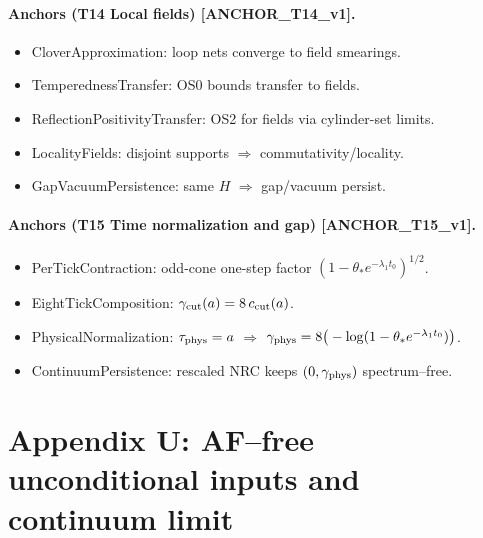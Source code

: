 \documentclass[11pt]{amsart}
\theoremstyle{plain}
\theoremstyle{definition}
\theoremstyle{remark}
\begin{document}
\paragraph{Anchors (T14 Local fields) [ANCHOR\_T14\_v1].}
\begin{itemize}
  \item CloverApproximation: loop nets converge to field smearings.
  \item TemperednessTransfer: OS0 bounds transfer to fields.
  \item ReflectionPositivityTransfer: OS2 for fields via cylinder-set limits.
  \item LocalityFields: disjoint supports $\Rightarrow$ commutativity/locality.
  \item GapVacuumPersistence: same $H$ $\Rightarrow$ gap/vacuum persist.
\end{itemize}

\paragraph{Anchors (T15 Time normalization and gap) [ANCHOR\_T15\_v1].}
\begin{itemize}
  \item PerTickContraction: odd-cone one-step factor $(1-\theta_* e^{-\lambda_1 t_0})^{1/2}$.
  \item EightTickComposition: $\gamma_{\rm cut}(a)=8\,c_{\rm cut}(a)$.
  \item PhysicalNormalization: $\tau_{\rm phys}=a$ $\Rightarrow$ $\gamma_{\rm phys}=8\big(-\log(1-\theta_* e^{-\lambda_1 t_0})\big)$.
  \item ContinuumPersistence: rescaled NRC keeps $(0,\gamma_{\rm phys})$ spectrum–free.
\end{itemize}

\medskip

\section{Appendix U: AF--free unconditional inputs and continuum limit}
\end{document}
